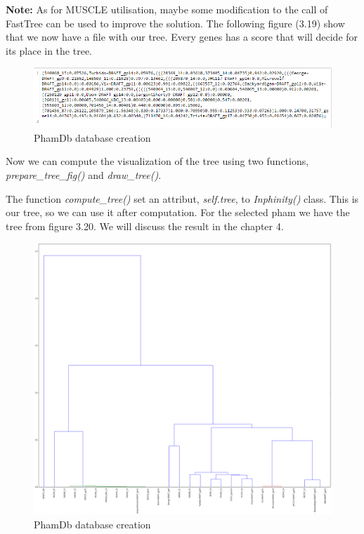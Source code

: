 \documentclass[a4paper,11pt]{report}
\begin{document}
\textbf{Note:} As for MUSCLE utilisation, maybe some modification to the call of FastTree can be used to improve the solution.
\newpage
The following figure (3.19) show that we now have a file with our tree. Every genes has a score that will decide for its place in the tree.

\begin{figure}[H] 
	\begin{center}
		\includegraphics[scale=0.6]{img/tree}
		\caption{PhamDb database creation}
	\end{center}
\end{figure}

Now we can compute the visualization of the tree using two functions, \textit{prepare\_tree\_fig()} and \textit{draw\_tree()}.

The function \textit{compute\_tree()} set an attribut, \textit{self.tree}, to \textit{Inphinity()} class. This is our tree, so we can use it after computation. For the selected pham we have the tree from figure 3.20. We will discuss the result in the chapter 4.

\begin{figure}[H] 
	\begin{center}
		\includegraphics[scale=0.28]{img/tree_fig}
		\caption{PhamDb database creation}
	\end{center}
\end{figure}
\newpage
\end{document}
